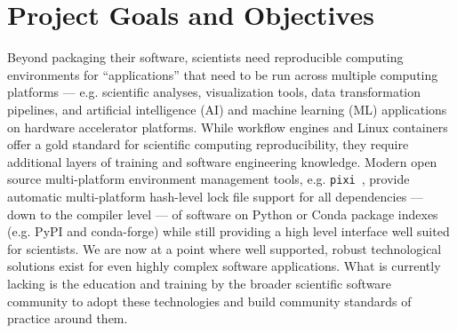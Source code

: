 \documentclass[letterpaper, 11pt]{article}
\begin{document}
\pagestyle{fancy}

\section{Project Goals and Objectives}



Beyond packaging their software, scientists need reproducible computing environments for ``applications'' that need to be run across multiple computing platforms --- e.g. scientific analyses, visualization tools, data transformation pipelines, and artificial intelligence (AI) and machine learning (ML) applications on hardware accelerator platforms.
While workflow engines and Linux containers offer a gold standard for scientific computing reproducibility, they require additional layers of training and software engineering knowledge.
Modern open source multi-platform environment management tools, e.g. \texttt{pixi}~\cite{Arts_pixi}, provide automatic multi-platform hash-level lock file support for all dependencies --- down to the compiler level --- of software on Python or Conda package indexes (e.g. PyPI and conda-forge) while still providing a high level interface well suited for scientists.
We are now at a point where well supported, robust technological solutions exist for even highly complex software applications.
What is currently lacking is the education and training by the broader scientific software community to adopt these technologies and build community standards of practice around them.
\end{document}
